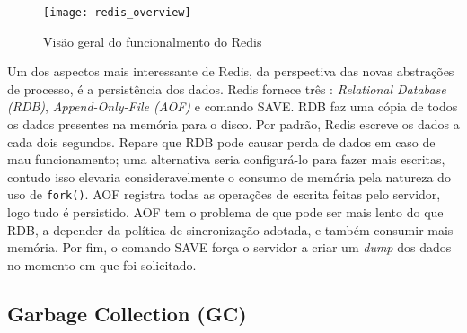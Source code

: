 \begin{figure}[!h]
  \centering
  \texttt{[image: redis\_overview]}
  \caption{Visão geral do funcionalmento do Redis}
  \label{fig:redis}
\end{figure}

Um dos aspectos mais interessante de Redis, da perspectiva das novas abstrações
de processo, é a persistência dos dados. Redis fornece três 
\citep{redisio}: \textit{Relational Database (RDB)}, \textit{Append-Only-File
(AOF)} e comando SAVE. RDB faz uma cópia de todos os dados presentes na
memória para o disco. Por padrão, Redis escreve os dados a cada dois
segundos. Repare que RDB pode causar perda de dados em caso de mau funcionamento;
uma alternativa seria configurá-lo para fazer mais escritas, contudo isso
elevaria consideravelmente o consumo de memória pela natureza do uso de
\texttt{fork()}. AOF registra todas as operações de escrita feitas pelo
servidor, logo tudo é persistido. AOF tem o problema de que pode ser mais
lento do que RDB, a depender da política de sincronização adotada, e também
consumir mais memória.  Por fim, o comando SAVE força o servidor a criar um
\textit{dump} dos dados no momento em que foi solicitado.



\subsection{Garbage Collection (GC)}
\label{sec:gc}

